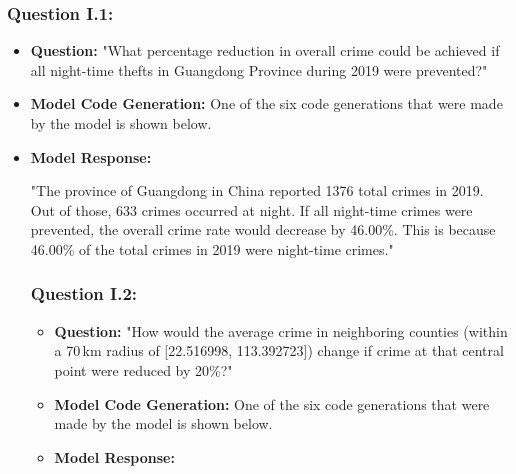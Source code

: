 \subsubsection{Question I.1:}
\begin{itemize}
    \item \textbf{Question:} "What percentage reduction in overall crime could be achieved if all night-time thefts in Guangdong Province during 2019 were prevented?"
    \item \textbf{Model Code Generation:} One of the six code generations that were made by the model is shown below. 

    



    \item \textbf{Model Response:} 
    
    \begin{tcolorbox}[colback=white!95!black, colframe=black, title=Q1 Response, fontupper=\scriptsize]

    "The province of Guangdong in China reported 1376 total crimes in 2019. Out of those, 633 crimes occurred at night. If all night-time crimes were prevented, the overall crime rate would decrease by 46.00\%. This is because 46.00\% of the total crimes in 2019 were night-time crimes."
    \end{tcolorbox}

\subsubsection{Question I.2:}
\begin{itemize}
    \item \textbf{Question:} "How would the average crime in neighboring counties (within a 70 km radius of [22.516998, 113.392723]) change if crime at that central point were reduced by 20\%?"
    \item \textbf{Model Code Generation:} One of the six code generations that were made by the model is shown below. 


    

  \item \textbf{Model Response:} 
    

    \begin{tcolorbox}[colback=white!95!black, colframe=black, title=Q2 Response, fontupper=\scriptsize]
    

\end{tcolorbox}
\end{itemize}
\end{itemize}
